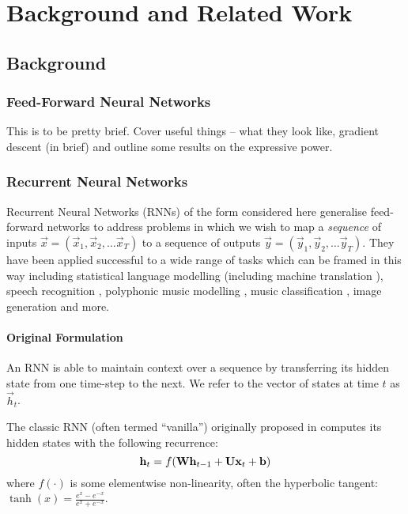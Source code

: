 
\chapter{Background and Related Work}\label{C:bg}
\section{Background}
\subsection{Feed-Forward Neural Networks}
This is to be pretty brief. Cover useful things -- what they look like, gradient descent
(in brief) and outline some results on the expressive power.

\subsection{Recurrent Neural Networks}
Recurrent Neural Networks (RNNs) of the form considered here generalise feed-forward networks to
address problems in which we wish to map a \emph{sequence} of inputs 
\(\vec{x} = (\vec{x}_1, \vec{x}_2, \dots \vec{x}_T) \) to a sequence of outputs
\(\vec{y} = (\vec{y}_1, \vec{y}_2, \dots \vec{y}_T) \). They have been applied successful to a
wide range of tasks which can be framed in this way including statistical language modelling
\autocite{Mikolov2012} (including machine translation \autocite{Cho2014}), speech recognition \autocite{Graves2006}, polyphonic music 
modelling \autocite{Boulanger-Lewandowski2012}, music classification \autocite{Choi2016},
image generation \autocite{Gregor2015} and more.

\subsubsection{Original Formulation}
An RNN is able to maintain context over a sequence by transferring its hidden state from one
time-step to the next. We refer to the vector of states at time \(t\) as \(\vec{h}_t\).

The classic RNN (often termed ``vanilla'') originally proposed in \autocite{Elman1990}
computes its hidden states with the following recurrence:
\begin{equation}
	\mathbf{h}_t = f(\mathbf{W}\mathbf{h}_{t-1} + \mathbf{U}\mathbf{x}_t +  \mathbf{b})
\label{eq:vanillarnn}
\end{equation} where \(f(\cdot)\) is some elementwise non-linearity, often the hyperbolic tangent:
\(\tanh(x) = \frac{e^{x} - e^{-x}}{e^{x} + e^{-x}}\).

